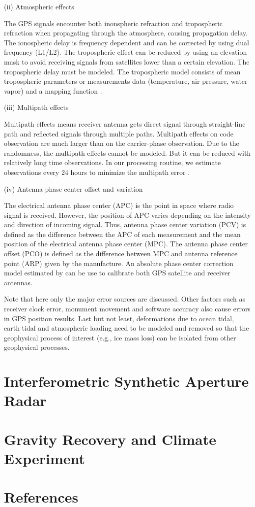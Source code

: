 (ii) Atmospheric effects  

The GPS signals encounter both inonspheric refraction and tropospheric refraction when propagating through the atmosphere, causing propagation delay.  The ionospheric delay is frequency dependent and can be corrected by using dual frequency (L1/L2).  The tropospheric effect can be reduced by using an elevation mask to avoid receiving signals from satellites lower than a certain elevation.  The tropospheric delay must be modeled.  The tropospheric model consists of mean tropospheric parameters or measurements data (temperature, air pressure, water vapor) and a mapping function \cite[]{niell1996chpt2,bohm2006chpt2,boehm2006chpt2}.  

(iii) Multipath effects

Multipath effects means receiver antenna gets direct signal through straight-line path and reflected signals through multiple paths. Multipath effects on code observation are much larger than on the carrier-phase observation.  Due to the randomness, the multipath effects cannot be modeled.  But it can be reduced with relatively long time observations.  In our processing routine, we estimate observations every 24 hours to minimize the multipath error \cite[]{sella2002chpt2}. 

(iv) Antenna phase center offset and variation 

The electrical antenna phase center (APC) is the point in space where radio signal is received.  However, the position of APC varies depending on the intensity and direction of incoming signal.  Thus, antenna phase center variation (PCV) is defined as the difference between the APC of each measurement and the mean position of the electrical antenna phase center (MPC).   The antenna phase center offset (PCO) is defined as the difference between MPC and antenna reference point (ARP) given by the manufacture.  An absolute phase center correction model estimated by \citet{schmid2007intro} can be use to calibrate both GPS satellite and receiver antennas. 

Note that here only the major error sources are discussed.  Other factors such as receiver clock error, monument movement and software accuracy also cause errors in GPS position results.  Last but not least, deformations due to ocean tidal, earth tidal and atmospheric loading need to be modeled and removed so that the geophysical process of interest (e.g., ice mass loss) can be isolated from other geophysical processes.  
   
\section{Interferometric Synthetic Aperture Radar}

\section{Gravity Recovery and Climate Experiment}

\section{References}
  
